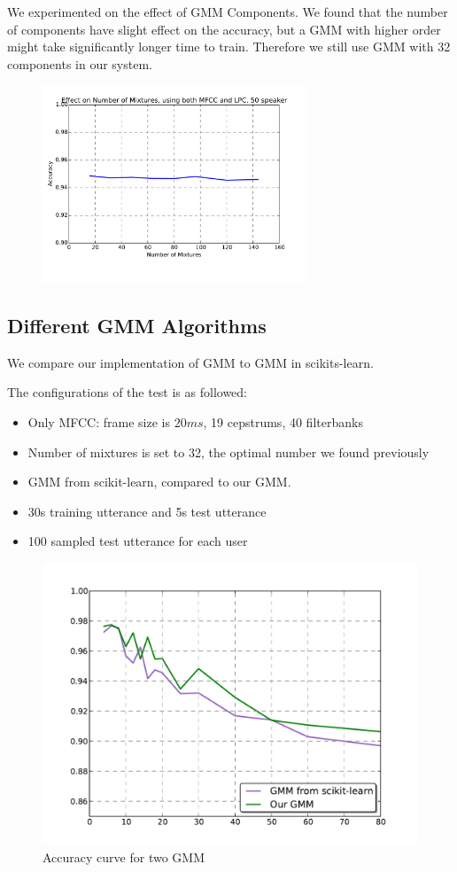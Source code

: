 We experimented on the effect of GMM Components. We found that the number of components
have slight effect on the accuracy, but a GMM with higher order might take
significantly longer time to train. Therefore we still use GMM with 32 components in our system.

\begin{figure}[H]
  \centering
  \includegraphics[width=0.7\textwidth]{img/nmixture.pdf}
\end{figure}

\subsection{Different GMM Algorithms}
We compare our implementation of GMM to GMM in scikits-learn.

The configurations of the test is as followed:
\begin{itemize}
    \item Only MFCC: frame size is $20 ms $, 19 cepstrums, 40 filterbanks
	\item Number of mixtures is set to 32, the optimal number we found previously
	\item GMM from scikit-learn, compared to our GMM.
	\item 30s training utterance and 5s test utterance
	\item 100 sampled test utterance for each user
\end{itemize}

\begin{figure}[!ht]
	\centering
	\includegraphics[width=\linewidth]{img/gmm-compare.pdf}
	\caption{Accuracy curve for two GMM}
\end{figure}

